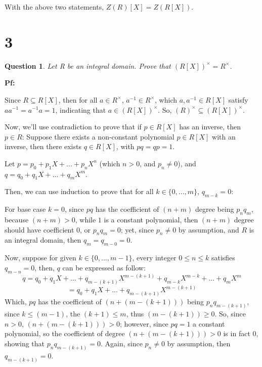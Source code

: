 \documentclass{article}
\newtheorem{question}{Question}
\begin{document}
With the above two statements, $Z(R)[X]=Z(R[X])$.

\break


\section*{3}
\begin{myBox}[]{}
    \begin{question}
        Let R be an integral domain. Prove that $(R[X])^\times = R^\times$.
    \end{question}
\end{myBox}

\textbf{Pf:}

Since $R \subseteq R[X]$, then for all $a\in R^\times$, $a^{-1}\in R^\times$, which $a,a^{-1}\in R[X]$ satisfy $aa^{-1}=a^{-1}a=1$,
indicating that $a\in (R[X])^\times$. So, $(R)^\times \subseteq (R[X])^\times$.

\hfill

Now, we'll use contradiction to prove that if $p\in R[X]$ has an inverse, then $p\in R$:
Suppose there exists a non-constant polynomial $p\in R[X]$ with an inverse, then there exists $q\in R[X]$,
with $pq=qp = 1$.

Let $p=p_0+p_1X+...+p_nX^n$ (which $n>0$, and $p_n \neq 0$), and $q = q_0+q_1X+...+q_mX^m$.

Then, we can use induction to prove that for all $k\in \{0,...,m\}$, $q_{m-k}=0$:

\hfill

For base case $k=0$, since $pq$ has the coefficient of $(n+m)$ degree being $p_nq_m$, because $(n+m)>0$, while $1$ is a constant polynomial,
then $(n+m)$ degree should have coefficient $0$, or $p_nq_m=0$; yet, since $p_n\neq 0$ by assumption, and $R$ is an integral domain,
then $q_m = q_{m-0}=0$.

Now, suppose for given $k\in \{0,...,m-1\}$, every integer $0\leq n \leq k$ satisfies $q_{m-n}=0$, then, $q$ can be expressed as follow:
$$q = q_0 + q_1X +... + q_{m-(k+1)}X^{m-(k+1)} + q_{m-k}X^{m-k}+...+q_mX^m$$
$$=q_0 + q_1X +... + q_{m-(k+1)}X^{m-(k+1)}$$
Which, $pq$ has the coefficient of $(n+(m-(k+1)))$ being $p_nq_{m-(k+1)}$, since $k\leq (m-1)$, the $(k+1)\leq m$, thus $(m-(k+1))\geq 0$.
So, since $n>0$, $(n+(m-(k+1)))>0$; however, since $pq=1$ a constant polynomial, so the coefficient of degree $(n+(m-(k+1)))>0$ is in fact $0$,
showing that $p_nq_{m-(k+1)}=0$. Again, since $p_n\neq 0$ by assumption, then $q_{m-(k+1)}=0$.

\hfill
\end{document}

